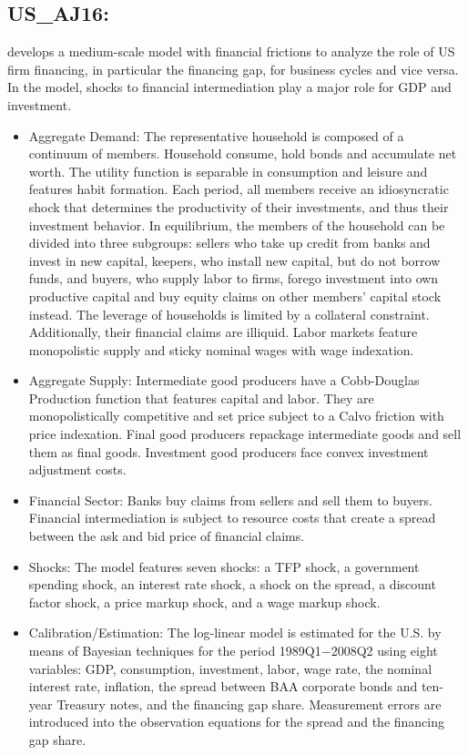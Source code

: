 \documentclass[11pt,a4paper]{article}
\begin{document}
	\subsection{US\_AJ16: \texorpdfstring{\cite{ajello2016financial}}{Ajello (2016)}}
	\label{USAJ16}
	\cite{ajello2016financial} develops a medium-scale model with financial frictions to analyze the role of US firm financing, in particular the financing gap, for business cycles and vice versa. In the model, shocks to financial intermediation play a major role for GDP and investment. 
	\begin{itemize}
		\item Aggregate Demand: The representative household is composed of a continuum of members. Household consume, hold bonds and accumulate net worth. The utility function is separable in consumption and leisure and features habit formation. Each period, all members receive an idiosyncratic shock that determines the productivity of their investments, and thus their investment behavior. In equilibrium, the members of the household can be divided into three subgroups: sellers who take up credit from banks and invest in new capital, keepers, who install new capital, but do not borrow funds, and buyers, who supply labor to firms, forego  investment into own productive capital and buy equity claims on other members' capital stock instead. The leverage of households is limited by a collateral constraint. Additionally, their financial claims are illiquid. Labor markets feature monopolistic supply and sticky nominal wages with wage indexation.
		
		\item Aggregate Supply: Intermediate good producers have a Cobb-Douglas Production function that features capital and labor. They are monopolistically competitive and set price subject to a Calvo friction with price indexation. Final good producers repackage intermediate goods and sell them as final goods. Investment good producers face convex investment adjustment costs.
		
		\item Financial Sector: Banks buy claims from sellers and sell them to buyers. Financial intermediation is subject to resource costs that create a spread between the ask and bid price of financial claims. 
		
		\item Shocks: The model features seven shocks: a TFP shock, a government spending shock, an interest rate shock, a shock on the spread, a discount factor shock, a price markup shock, and a wage markup shock.
		
		\item Calibration/Estimation: The log-linear model is estimated for the U.S. by means of Bayesian techniques for the period 1989Q1$-$2008Q2 using eight variables: GDP, consumption, investment, labor, wage rate, the nominal interest rate, inflation, the spread between BAA corporate bonds and ten-year Treasury notes, and the financing gap share. Measurement errors are introduced into the observation equations for the spread and the financing gap share.
		
	\end{itemize}
\end{document}
